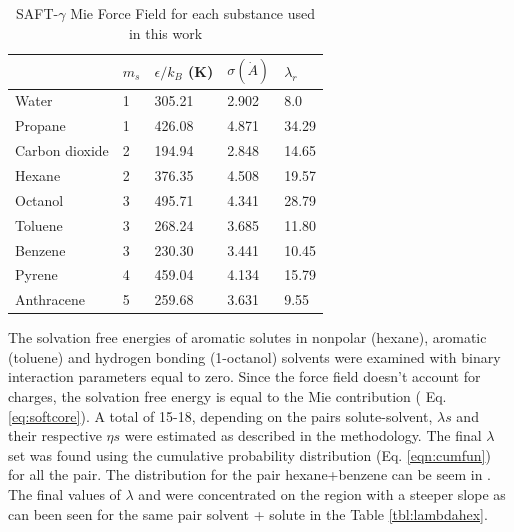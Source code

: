 \begin{table}[h]
\centering
  \caption{SAFT-$\gamma$ Mie Force Field for each substance used in this work}
  \label{tbl:parameters}
  \begin{tabular}{lllll}
  	\hline
  	               & $m_s$ & $\epsilon/k_{B}$ (K) & $\sigma (\dot{A})$ & $\lambda_r$ \\ \hline
  	Water          & 1     & 305.21               & 2.902              & 8.0         \\
  	Propane        & 1     & 426.08               & 4.871              & 34.29       \\
  	Carbon dioxide & 2     & 194.94               & 2.848              & 14.65       \\
  	Hexane         & 2     & 376.35               & 4.508              & 19.57       \\
  	Octanol        & 3     & 495.71               & 4.341              & 28.79       \\
  	Toluene        & 3     & 268.24               & 3.685              & 11.80       \\
  	Benzene        & 3     & 230.30               & 3.441              & 10.45       \\
  	Pyrene         & 4     & 459.04               & 4.134              & 15.79       \\
  	Anthracene     & 5     & 259.68               & 3.631              & 9.55        \\ \hline
  \end{tabular}

\end{table}

The solvation free energies of aromatic solutes in nonpolar (hexane), aromatic (toluene) and hydrogen bonding (1-octanol) solvents were examined with binary interaction parameters equal to zero. Since the force field doesn't account for charges, the solvation free energy is equal to the Mie contribution ( Eq. \eqref{eq:softcore}). A total of 15-18, depending on the pairs solute-solvent,  $\lambda s$ and their respective $\eta s$ were estimated as described in the methodology. The final $\lambda$ set was found using  
the cumulative probability distribution (Eq. \eqref{eqn:cumfun}) for all the pair. The distribution for the pair hexane+benzene can be seem in . The final values of $\lambda$ and were concentrated on the region with a steeper slope as can been seen for the same pair solvent + solute in the Table \ref{tbl:lambdahex}.

